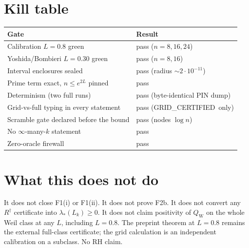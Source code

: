 \documentclass[11pt]{article}
\newcommand{\QW}{Q_{\mathrm W}}
\newcommand{\cert}{\textcolor{green!40!black}{GRID\_CERTIFIED}}
\begin{document}
\section{Kill table}

\begin{center}
\small
\begin{tabular}{@{}ll@{}}
\toprule
Gate & Result\\
\midrule
Calibration $L=0.8$ green & pass ($n=8,16,24$)\\
Yoshida/Bombieri $L=0.30$ green & pass ($n=8,16$)\\
Interval enclosures sealed & pass (radius $\sim 2\cdot 10^{-11}$)\\
Prime term exact, $n\le e^{2L}$ pinned & pass\\
Determinism (two full runs) & pass (byte-identical PIN dump)\\
Grid-vs-full typing in every statement & pass (\cert\ only)\\
Scramble gate declared before the bound & pass (nodes $\log n$)\\
No $\infty$-many-$k$ statement & pass\\
Zero-oracle firewall & pass\\
\bottomrule
\end{tabular}
\end{center}

\section{What this does not do}

It does not close F1(i) or F1(ii).  It does not prove F2b.  It does
not convert any $R^\dagger$ certificate into $\lambda_*(L_k)\ge 0$.
It does not claim positivity of $\QW$ on the whole Weil class at any
$L$, including $L=0.8$.  The preprint theorem at $L=0.8$ remains the
external full-class certificate; the grid calculation is an
independent calibration on a subclass.  No RH claim.
\end{document}
